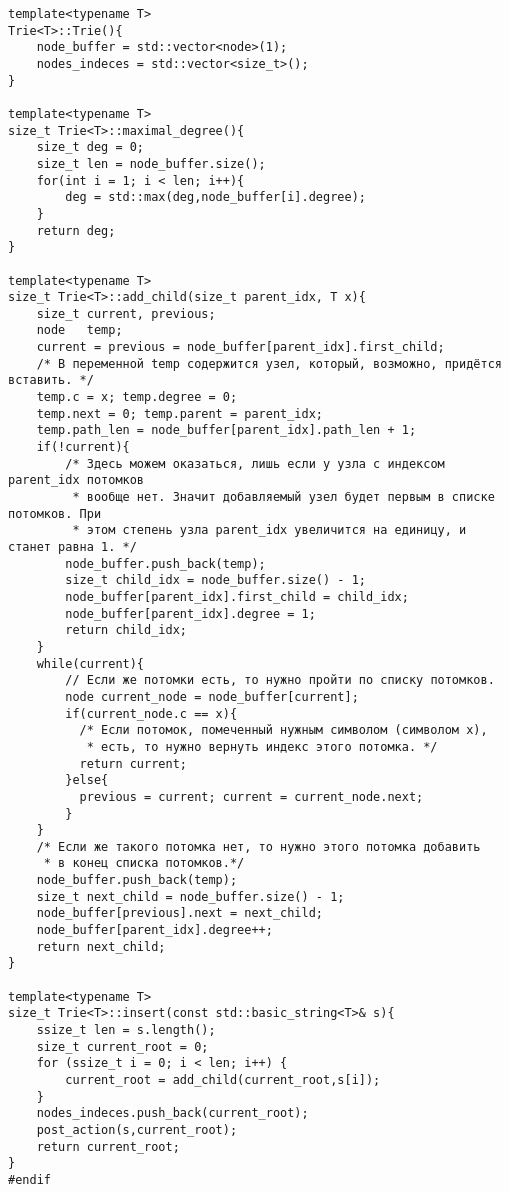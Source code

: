 \documentclass[10pt]{report}
\begin{document}
\begin{verbatim}
template<typename T>
Trie<T>::Trie(){
    node_buffer = std::vector<node>(1);
    nodes_indeces = std::vector<size_t>();
}

template<typename T>
size_t Trie<T>::maximal_degree(){
    size_t deg = 0;
    size_t len = node_buffer.size();
    for(int i = 1; i < len; i++){
        deg = std::max(deg,node_buffer[i].degree);
    }
    return deg;
}

template<typename T>
size_t Trie<T>::add_child(size_t parent_idx, T x){
    size_t current, previous;
    node   temp;
    current = previous = node_buffer[parent_idx].first_child;
    /* В переменной temp содержится узел, который, возможно, придётся вставить. */
    temp.c = x; temp.degree = 0;
    temp.next = 0; temp.parent = parent_idx;
    temp.path_len = node_buffer[parent_idx].path_len + 1;
    if(!current){
        /* Здесь можем оказаться, лишь если у узла с индексом parent_idx потомков
         * вообще нет. Значит добавляемый узел будет первым в списке потомков. При
         * этом степень узла parent_idx увеличится на единицу, и станет равна 1. */
        node_buffer.push_back(temp);
        size_t child_idx = node_buffer.size() - 1;
        node_buffer[parent_idx].first_child = child_idx;
        node_buffer[parent_idx].degree = 1;
        return child_idx;
    }
    while(current){
        // Если же потомки есть, то нужно пройти по списку потомков.
        node current_node = node_buffer[current];
        if(current_node.c == x){
          /* Если потомок, помеченный нужным символом (символом x),
           * есть, то нужно вернуть индекс этого потомка. */
          return current;
        }else{
          previous = current; current = current_node.next;
        }
    }
    /* Если же такого потомка нет, то нужно этого потомка добавить
     * в конец списка потомков.*/
    node_buffer.push_back(temp);
    size_t next_child = node_buffer.size() - 1;
    node_buffer[previous].next = next_child;
    node_buffer[parent_idx].degree++;
    return next_child;
}

template<typename T>
size_t Trie<T>::insert(const std::basic_string<T>& s){
    ssize_t len = s.length();
    size_t current_root = 0;
    for (ssize_t i = 0; i < len; i++) {
        current_root = add_child(current_root,s[i]);
    }
    nodes_indeces.push_back(current_root);
    post_action(s,current_root);
    return current_root;
}
#endif
\end{verbatim}
\end{document}
